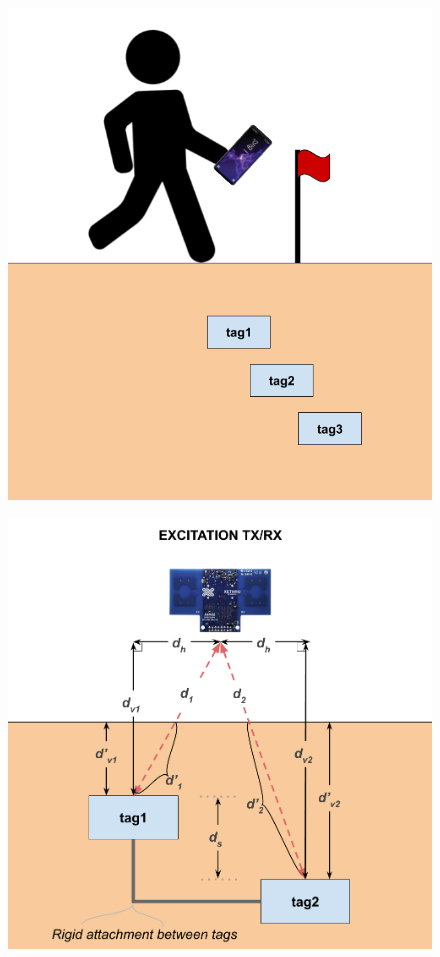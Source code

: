 \documentclass[12pt]{article}
\begin{document}
\begin{figure}
  \hspace*{-0.8cm}
  \begin{minipage}[b]{0.55\textwidth}
    \centering
    \includegraphics[scale=0.38]{multiTag.png}\\
  \end{minipage}%
\begin{minipage}[b]{0.55\textwidth}
  \centering
  \includegraphics[scale=0.25]{multiTagCloseup.png}\\

\end{minipage}
\end{figure}
\end{document}
